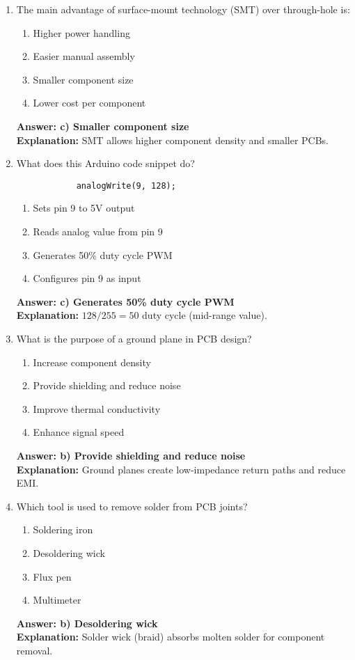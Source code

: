 \documentclass{article}
\begin{document}
\begin{enumerate}
		\item The main advantage of surface-mount technology (SMT) over through-hole is:
		\begin{enumerate}
			\item Higher power handling
			\item Easier manual assembly
			\item Smaller component size
			\item Lower cost per component
		\end{enumerate}
		\textbf{Answer: c) Smaller component size} \\
		\textbf{Explanation:} SMT allows higher component density and smaller PCBs.
		
		\item What does this Arduino code snippet do?
		\begin{verbatim}
			analogWrite(9, 128);
		\end{verbatim}
		\begin{enumerate}
			\item Sets pin 9 to 5V output
			\item Reads analog value from pin 9
			\item Generates 50\% duty cycle PWM
			\item Configures pin 9 as input
		\end{enumerate}
		\textbf{Answer: c) Generates 50\% duty cycle PWM} \\
	\textbf{	Explanation:} $128/255 = 50 $ duty cycle (mid-range value).
		
		\item What is the purpose of a ground plane in PCB design?
		\begin{enumerate}
			\item Increase component density
			\item Provide shielding and reduce noise
			\item Improve thermal conductivity
			\item Enhance signal speed
		\end{enumerate}
		\textbf{Answer: b) Provide shielding and reduce noise} \\
		\textbf{Explanation:} Ground planes create low-impedance return paths and reduce EMI.
		
		\item Which tool is used to remove solder from PCB joints?
		\begin{enumerate}
			\item Soldering iron
			\item Desoldering wick
			\item Flux pen
			\item Multimeter
		\end{enumerate}
		\textbf{Answer: b) Desoldering wick} \\
		\textbf{Explanation:} Solder wick (braid) absorbs molten solder for component removal.
		

\end{enumerate}
\end{document}
